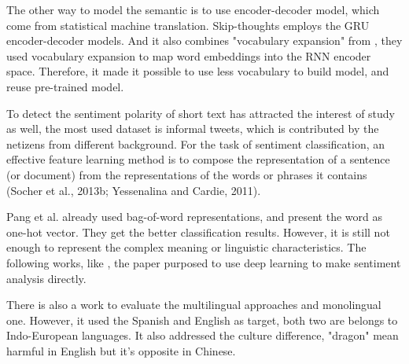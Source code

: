The other way to model the semantic is to use encoder-decoder model, which come from statistical machine translation. Skip-thoughts\cite{kiros2015skip} employs the GRU encoder-decoder models.
And it also combines "vocabulary expansion" from \cite{MikolovLS13}, they used vocabulary expansion to map word embeddings into the RNN encoder space.
Therefore, it made it possible to use less vocabulary to build model, and reuse pre-trained model.

To detect the sentiment polarity of short text has attracted the interest of study as well, the most used dataset is informal tweets, which is contributed by the netizens from different background. 
For the task of sentiment classification, an effective feature learning method is to compose the representation of a
sentence (or document) from the representations of the words or phrases it contains (Socher et al., 2013b; Yessenalina and Cardie, 2011).

Pang et al. \cite{pang2002thumbs} already used bag-of-word representations, and present the word as one-hot vector. They get the better classification results. However, it is still not enough to represent the complex meaning or linguistic characteristics.
The following works, like \cite{tang2014learning}, the paper purposed to use deep learning to make sentiment analysis directly.

There is also a work\cite{multilingual} to evaluate the multilingual approaches and monolingual one. However, it used the Spanish and English as target, both two are belongs 
to Indo-European languages. It also addressed the culture difference, "dragon" mean harmful in English but it's opposite in Chinese. 
